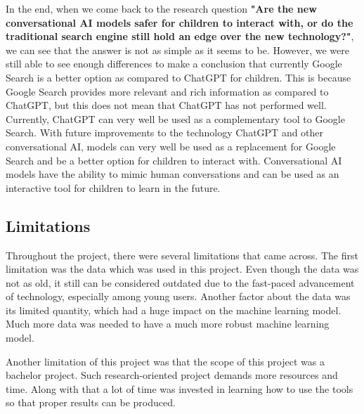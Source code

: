 \documentclass[50pt]{usiinfbachelorproject}
\begin{document}
In the end, when we come back to the research question \textbf{"Are the new conversational AI models safer for children to interact with, or do the traditional search engine still hold an edge over the new technology?"}, we can see that the answer is not as simple as it seems to be. However, we were still able to see enough differences to make a conclusion that currently Google Search is a better option as compared to ChatGPT for children. This is because Google Search provides more relevant and rich information as compared to ChatGPT, but this does not mean that ChatGPT has not performed well. Currently, ChatGPT can very well be used as a complementary tool to Google Search. With future improvements to the technology ChatGPT and other conversational AI, models can very well be used as a replacement for Google Search and be a better option for children to interact with. Conversational AI models have the ability to mimic human conversations and can be used as an interactive tool for children to learn in the future. 
\subsection{Limitations}
Throughout the project, there were several limitations that came across. The first limitation was the data which was used in this project. Even though the data was not as old, it still can be considered outdated due to the fast-paced advancement of technology, especially among young users. Another factor about the data was its limited quantity, which had a huge impact on the machine learning model. Much more data was needed to have a much more robust machine learning model. 

Another limitation of this project was that the scope of this project was a bachelor project. Such research-oriented project demands more resources and time. Along with that a lot of time was invested in learning how to use the tools so that proper results can be produced.
\end{document}
